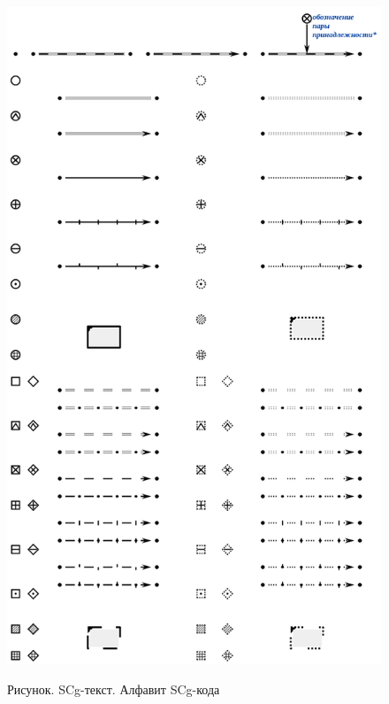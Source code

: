 \begin{figure}[H]
	\centering
	\caption{Рисунок. SCg-текст. Алфавит SCg-кода\scnsupergroupsign}
	\includegraphics[scale=0.7]{images/intro/scg/SCg-full.png}
	\label{fig:scg_full}
\end{figure}

